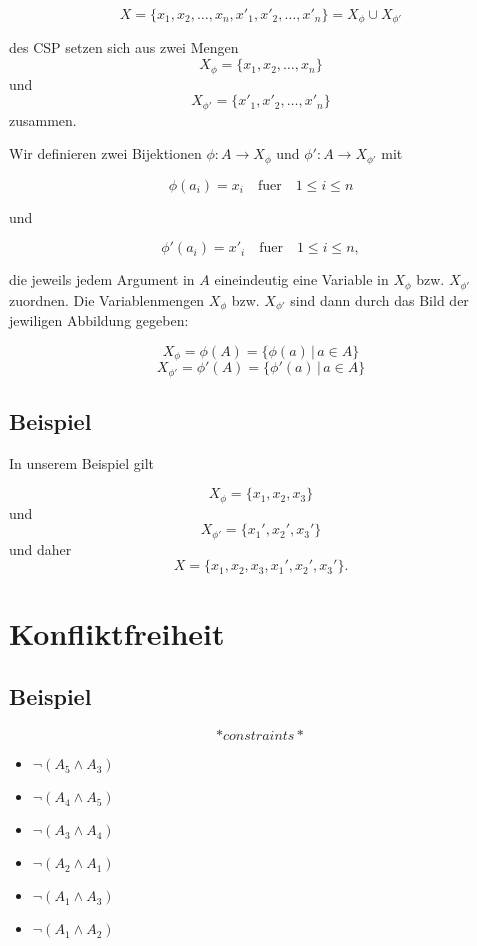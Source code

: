 \[ X  = \{x_1,x_2,\dots,x_n,x'_1,x'_2,\dots,x'_n\} = X_{\phi} \cup X_{\phi'} \]

des CSP setzen sich aus zwei Mengen \[X_{\phi} = \{x_1,x_2,\dots,x_n\}
\] und \[X_{\phi'} = \{x'_1,x'_2,\dots,x'_n\} \] zusammen.

Wir definieren zwei Bijektionen $\phi \colon A \to X_{\phi}$ und
$\phi' \colon A \to X_{\phi'}$ mit

\[ \phi(a_i) = x_i \quad \text{fuer} \quad 1 \leq i \leq  n \]

und

\[ \phi'(a_i) = x'_i \quad \text{fuer} \quad 1 \leq i \leq  n,\]

die jeweils jedem Argument in $A$ eineindeutig eine Variable in
$X_{\phi}$ bzw. $X_{\phi'}$ zuordnen. Die Variablenmengen $X_{\phi}$
bzw. $X_{\phi'}$ sind dann durch das Bild der jewiligen Abbildung
gegeben:

\[ X_{\phi}  = \phi(A) = \{ \phi(a) \,|\, a \in A \} \]
\[ X_{\phi'}  = \phi'(A) = \{ \phi'(a) \,|\, a \in A \} \]

\subsection{Beispiel}\label{beispiel-1}

In unserem Beispiel gilt

\[ X_{\phi} = \{x_1,x_2,x_3\} \] und \[ X_{\phi'} = \{x_1',x_2',x_3'\}\]
und daher \[ X = \{x_1,x_2,x_3,x_1',x_2',x_3'\}.\]

\section{Konfliktfreiheit}\label{konfliktfreiheit}

\subsection{Beispiel}\label{beispiel-2}

\[*constraints*\]

\begin{itemize}
\itemsep1pt\parskip0pt
\item
  $\lnot ( A_5 \land A_3 ) $
\item
  $\lnot ( A_4 \land A_5 ) $
\item
  $\lnot ( A_3 \land A_4 ) $
\item
  $\lnot ( A_2 \land A_1 ) $
\item
  $\lnot ( A_1 \land A_3 ) $
\item
  $\lnot ( A_1 \land A_2 ) $
\end{itemize}
